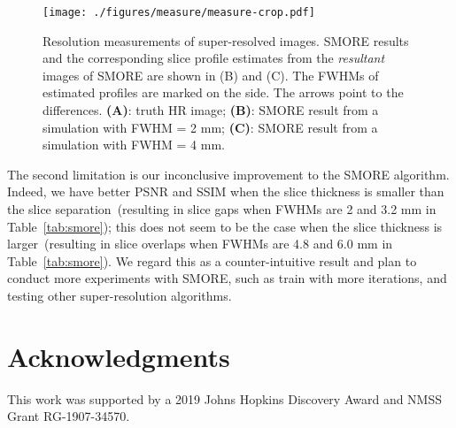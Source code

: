 \documentclass[runningheads]{llncs}
\begin{document}
\begin{figure}[t]
    \centering
    \texttt{[image: ./figures/measure/measure-crop.pdf]}
    \caption{Resolution measurements of super-resolved images. SMORE
    results and the corresponding slice profile estimates from the
    \textit{resultant} images of SMORE are shown in (B) and (C). The
    FWHMs of estimated profiles are marked on the side. The arrows
    point to the differences. \textbf{(A)}: truth HR image;
    \textbf{(B)}: SMORE result from a simulation with FWHM = 2 mm;
    \textbf{(C)}: SMORE result from a simulation with FWHM = 4 mm.}
    \label{fig:measure}
\end{figure}

The second limitation is our inconclusive improvement to the SMORE
algorithm. Indeed, we have better PSNR and SSIM when the slice
thickness is smaller than the slice separation~(resulting in slice
gaps when FWHMs are 2 and 3.2 mm in Table~\ref{tab:smore}); this does
not seem to be the case when the slice thickness is larger~(resulting
in slice overlaps when FWHMs are 4.8 and 6.0 mm in
Table~\ref{tab:smore}). We regard this as a counter-intuitive result
and plan to conduct more experiments with SMORE, such as train with
more iterations, and testing other super-resolution algorithms.

\section{Acknowledgments}
This work was supported by a 2019 Johns Hopkins Discovery Award and
NMSS Grant RG-1907-34570.



\end{document}
